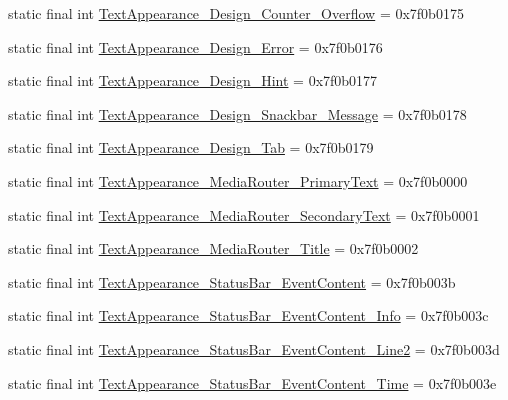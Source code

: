 \begin{CompactItemize}
\item 
static final int \hyperlink{classandroid_1_1support_1_1v7_1_1palette_1_1_r_1_1style_58d47c583d21030238f5e1ceda9cfcd7}{TextAppearance\_\-Design\_\-Counter\_\-Overflow} = 0x7f0b0175
\item 
static final int \hyperlink{classandroid_1_1support_1_1v7_1_1palette_1_1_r_1_1style_4e3df877f4db77f18bcecb0ce83a2664}{TextAppearance\_\-Design\_\-Error} = 0x7f0b0176
\item 
static final int \hyperlink{classandroid_1_1support_1_1v7_1_1palette_1_1_r_1_1style_153fcdeb1d6afbecc7b6fd8fac373cb2}{TextAppearance\_\-Design\_\-Hint} = 0x7f0b0177
\item 
static final int \hyperlink{classandroid_1_1support_1_1v7_1_1palette_1_1_r_1_1style_b91d8875df5ddc1da59a3f9b9d15abf9}{TextAppearance\_\-Design\_\-Snackbar\_\-Message} = 0x7f0b0178
\item 
static final int \hyperlink{classandroid_1_1support_1_1v7_1_1palette_1_1_r_1_1style_0b857a234520ccdb7b416b412343f6f8}{TextAppearance\_\-Design\_\-Tab} = 0x7f0b0179
\item 
static final int \hyperlink{classandroid_1_1support_1_1v7_1_1palette_1_1_r_1_1style_eb70c12594427f6fb5782fe8e88f2dd3}{TextAppearance\_\-MediaRouter\_\-PrimaryText} = 0x7f0b0000
\item 
static final int \hyperlink{classandroid_1_1support_1_1v7_1_1palette_1_1_r_1_1style_cfaf5a5681f299ecfe0b9454e71522ed}{TextAppearance\_\-MediaRouter\_\-SecondaryText} = 0x7f0b0001
\item 
static final int \hyperlink{classandroid_1_1support_1_1v7_1_1palette_1_1_r_1_1style_837c7b64205996002c22f7d90102faf9}{TextAppearance\_\-MediaRouter\_\-Title} = 0x7f0b0002
\item 
static final int \hyperlink{classandroid_1_1support_1_1v7_1_1palette_1_1_r_1_1style_f6e3897dadf29311deb860ccc8953daf}{TextAppearance\_\-StatusBar\_\-EventContent} = 0x7f0b003b
\item 
static final int \hyperlink{classandroid_1_1support_1_1v7_1_1palette_1_1_r_1_1style_a39b57b651e2d1d0ae40f8bf1a2db12c}{TextAppearance\_\-StatusBar\_\-EventContent\_\-Info} = 0x7f0b003c
\item 
static final int \hyperlink{classandroid_1_1support_1_1v7_1_1palette_1_1_r_1_1style_ca8977110c5d12f4c74bdd2e691dfaa1}{TextAppearance\_\-StatusBar\_\-EventContent\_\-Line2} = 0x7f0b003d
\item 
static final int \hyperlink{classandroid_1_1support_1_1v7_1_1palette_1_1_r_1_1style_fc89c8749a602e48041756fb549ddb80}{TextAppearance\_\-StatusBar\_\-EventContent\_\-Time} = 0x7f0b003e

\end{CompactItemize}

